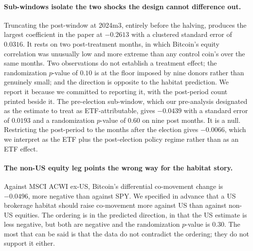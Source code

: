 \documentclass[12pt,a4paper]{article}
\begin{document}
\paragraph{Sub-windows isolate the two shocks the design cannot difference out.} Truncating the post-window at 2024m3, entirely before the halving, produces the largest coefficient in the paper at
$-0.2613$ with a clustered standard error of $0.0316$. It rests on
two post-treatment months, in which Bitcoin's equity correlation was unusually low and more extreme than any control coin's over the same months. Two observations do not establish a treatment effect; the randomization $p$-value of
$0.10$ is at the floor imposed by nine donors rather than genuinely small; and the direction is opposite to the habitat prediction. We report it because we committed to reporting it, with the post-period count printed beside it. The pre-election sub-window, which our pre-analysis designated as the estimate to treat as ETF-attributable, gives
$-0.0439$ with a standard error of $0.0193$ and a randomization $p$-value of
$0.60$ on nine post months. It is a null. Restricting the post-period to the months after the election gives
$-0.0066$, which we interpret as the ETF plus the post-election policy regime rather than as an ETF effect.

\paragraph{The non-US equity leg points the wrong way for the habitat story.} Against MSCI ACWI ex-US, Bitcoin's differential co-movement change is
$-0.0496$, more negative than against SPY. We specified in advance that a US brokerage habitat should raise co-movement more against US than against non-US equities. The ordering is in the predicted direction, in that the US estimate is less negative, but both are negative and the randomization $p$-value is
$0.30$. The most that can be said is that the data do not contradict the ordering; they do not support it either.
\end{document}

